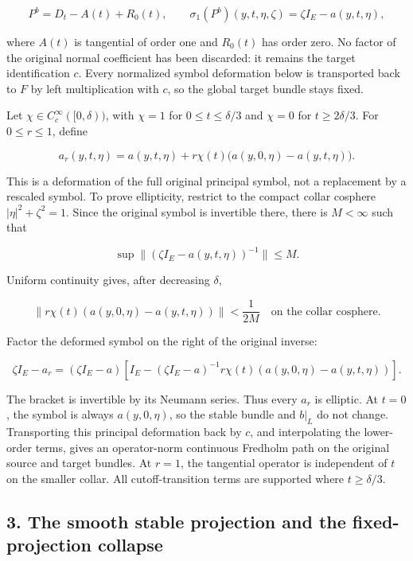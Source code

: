 \documentclass[
  11pt,
]{article}
\begin{document}
\[
 P^b=D_t-A(t)+R_0(t),
 \qquad
 \sigma_1(P^b)(y,t,\eta,\zeta)=\zeta I_E-a(y,t,\eta),
 \tag{BR5}
\]

where \(A(t)\) is tangential of order one and \(R_0(t)\) has order zero.
No factor of the original normal coefficient has been discarded: it
remains the target identification \(c\). Every normalized symbol
deformation below is transported back to \(F\) by left multiplication
with \(c\), so the global target bundle stays fixed.

Let \(\chi\in C_c^\infty([0,\delta))\), with \(\chi=1\) for
\(0\leq t\leq\delta/3\) and \(\chi=0\) for \(t\geq2\delta/3\). For
\(0\leq r\leq1\), define

\[
 a_r(y,t,\eta)
 =a(y,t,\eta)+r\chi(t)\bigl(a(y,0,\eta)-a(y,t,\eta)\bigr).
 \tag{BR6}
\]

This is a deformation of the full original principal symbol, not a
replacement by a rescaled symbol. To prove ellipticity, restrict to the
compact collar cosphere \(|\eta|^2+\zeta^2=1\). Since the original
symbol is invertible there, there is \(M<\infty\) such that

\[
 \sup\|(\zeta I_E-a(y,t,\eta))^{-1}\|\leq M .
 \tag{BR7}
\]

Uniform continuity gives, after decreasing \(\delta\),

\[
 \|r\chi(t)(a(y,0,\eta)-a(y,t,\eta))\|
 <\frac{1}{2M}
 \quad\text{on the collar cosphere.}
 \tag{BR8}
\]

Factor the deformed symbol on the right of the original inverse:

\[
 \zeta I_E-a_r
 =(\zeta I_E-a)
 \left[I_E-(\zeta I_E-a)^{-1}
 r\chi(t)(a(y,0,\eta)-a(y,t,\eta))\right].
 \tag{BR9}
\]

The bracket is invertible by its Neumann series. Thus every \(a_r\) is
elliptic. At \(t=0\), the symbol is always \(a(y,0,\eta)\), so the
stable bundle and \(b|_L\) do not change. Transporting this principal
deformation back by \(c\), and interpolating the lower-order terms,
gives an operator-norm continuous Fredholm path on the original source
and target bundles. At \(r=1\), the tangential operator is independent
of \(t\) on the smaller collar. All cutoff-transition terms are
supported where \(t\geq\delta/3\).

\subsection{3. The smooth stable projection and the fixed-projection
collapse}\label{the-smooth-stable-projection-and-the-fixed-projection-collapse}
\end{document}
